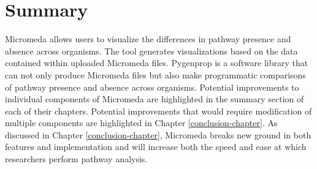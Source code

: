 \section{Summary} \label{introduction_summary}

Micromeda allows users to visualize the differences in pathway presence and 
absence across organisms. The tool generates visualizations based on the data 
contained within uploaded Micromeda files. Pygenprop is a software library that 
can not only produce Micromeda files but also make programmatic comparisons of 
pathway presence and absence across organisms. Potential improvements to 
individual components of Micromeda are highlighted in the summary section of 
each of their chapters. Potential improvements that would require modification 
of multiple components are highlighted in Chapter \ref{conclusion-chapter}. As 
discussed in Chapter \ref{conclusion-chapter}, Micromeda breaks new ground in 
both features and implementation and will increase both the speed and ease at 
which researchers perform pathway analysis.